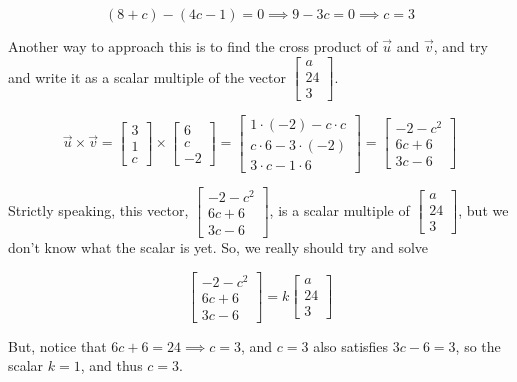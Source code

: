 \documentclass[11pt]{article}
\begin{document}
\begin{prob}[(11 pts)]
\begin{subprob}
\begin{solution}
$$(8 + c) - (4c - 1) = 0 \implies 9 - 3c = 0 \implies c = 3$$

Another way to approach this is to find the cross product of $\vec u$ and $\vec v$, and try and write it as a scalar multiple of the vector $\begin{bmatrix} a \\ 24 \\ 3 \end{bmatrix}$. 

$$\vec u \times \vec v = \begin{bmatrix} 3 \\ 1 \\ c \end{bmatrix} \times \begin{bmatrix} 6 \\ c \\ -2 \end{bmatrix} = \begin{bmatrix} 1 \cdot (-2) - c \cdot c \\ c \cdot 6 - 3 \cdot (-2) \\ 3 \cdot c - 1 \cdot 6 \end{bmatrix} = \begin{bmatrix} -2 - c^2 \\ 6c + 6 \\ 3c - 6 \end{bmatrix}$$

Strictly speaking, this vector, $\begin{bmatrix} -2 - c^2 \\ 6c + 6 \\ 3c - 6 \end{bmatrix}$, is a scalar multiple of $\begin{bmatrix} a \\ 24 \\ 3 \end{bmatrix}$, but we don't know what the scalar is yet. So, we really should try and solve

$$\begin{bmatrix} -2 - c^2 \\ 6c + 6 \\ 3c - 6 \end{bmatrix} = k \begin{bmatrix} a \\ 24 \\ 3 \end{bmatrix}$$

But, notice that $6c + 6 = 24 \implies c = 3$, and $c = 3$ also satisfies $3c - 6 = 3$, so the scalar $k = 1$, and thus $\boxed{c = 3}$.

\end{solution}
\end{subprob}


\end{prob}
\end{document}
